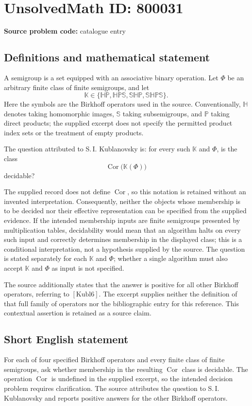 \documentclass[11pt]{article}
\begin{document}
\section*{UnsolvedMath ID: 800031}
\textbf{Source problem code:} catalogue entry
\subsection{Definitions and mathematical statement}
A semigroup is a set equipped with an associative binary operation. Let \(\Phi\) be an arbitrary finite class of finite semigroups, and let
\[
\mathbb K\in\{\mathbb H\mathbb P,\mathbb H\mathbb P\mathbb S,\mathbb S\mathbb H\mathbb P,\mathbb S\mathbb H\mathbb P\mathbb S\}.
\]
Here the symbols are the Birkhoff operators used in the source. Conventionally, \(\mathbb H\) denotes taking homomorphic images, \(\mathbb S\) taking subsemigroups, and \(\mathbb P\) taking direct products; the supplied excerpt does not specify the permitted product index sets or the treatment of empty products.

The question attributed to S.\,I. Kublanovsky is: for every such \(\mathbb K\) and \(\Phi\), is the class
\[
\operatorname{Cor}\bigl(\mathbb K(\Phi)\bigr)
\]
decidable?

The supplied record does not define \(\operatorname{Cor}\), so this notation is retained without an invented interpretation. Consequently, neither the objects whose membership is to be decided nor their effective representation can be specified from the supplied evidence. If the intended membership inputs are finite semigroups presented by multiplication tables, decidability would mean that an algorithm halts on every such input and correctly determines membership in the displayed class; this is a conditional interpretation, not a hypothesis supplied by the source. The question is stated separately for each \(\mathbb K\) and \(\Phi\); whether a single algorithm must also accept \(\mathbb K\) and \(\Phi\) as input is not specified.

The source additionally states that the answer is positive for all other Birkhoff operators, referring to \([\mathrm{Kubl6}]\). The excerpt supplies neither the definition of that full family of operators nor the bibliographic entry for this reference. This contextual assertion is retained as a source claim.
\subsection{Short English statement}
For each of four specified Birkhoff operators and every finite class of finite semigroups, ask whether membership in the resulting \(\operatorname{Cor}\) class is decidable. The operation \(\operatorname{Cor}\) is undefined in the supplied excerpt, so the intended decision problem requires clarification. The source attributes the question to S.\,I. Kublanovsky and reports positive answers for the other Birkhoff operators.
\end{document}
